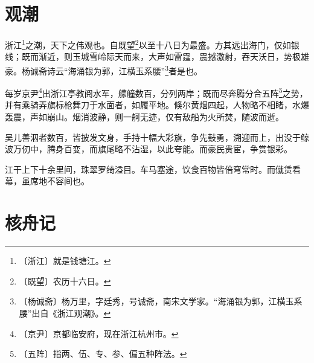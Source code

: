 \documentclass[12pt,UTF-8,openany]{ctexbook}
\begin{document}
\chapter{观潮}

\begin{normalsize}
    
    浙江\footnote{〔浙江〕就是钱塘江。}之潮，天下之伟观也。自既望\footnote{〔既望〕农历十六日。}以至十八日为最盛。方其远出海门，仅如银线；既而渐近，则玉城雪岭际天而来，大声如雷霆，震撼激射，吞天沃日，势极雄豪。杨诚斋诗云“海涌银为郭，江横玉系腰”\footnote{〔杨诚斋〕杨万里，字廷秀，号诚斋，南宋文学家。“海涌银为郭，江横玉系腰”出自《浙江观潮》。}者是也。
    
    每岁京尹\footnote{〔京尹〕京都临安府，现在浙江杭州市。}出浙江亭教阅水军，艨艟数百，分列两岸；既而尽奔腾分合五阵\footnote{〔五阵〕指两、伍、专、参、偏五种阵法。}之势，并有乘骑弄旗标枪舞刀于水面者，如履平地。倏尔黄烟四起，人物略不相睹，水爆轰震，声如崩山。烟消波静，则一舸无迹，仅有敌船为火所焚，随波而逝。
    
    吴儿善泅者数百，皆披发文身，手持十幅大彩旗，争先鼓勇，溯迎而上，出没于鲸波万仞中，腾身百变，而旗尾略不沾湿，以此夸能。而豪民贵宦，争赏银彩。
    
    江干上下十余里间，珠翠罗绮溢目。车马塞途，饮食百物皆倍穹常时。而僦赁看幕，虽席地不容间也。
\end{normalsize}



\chapter{核舟记}
\end{document}

